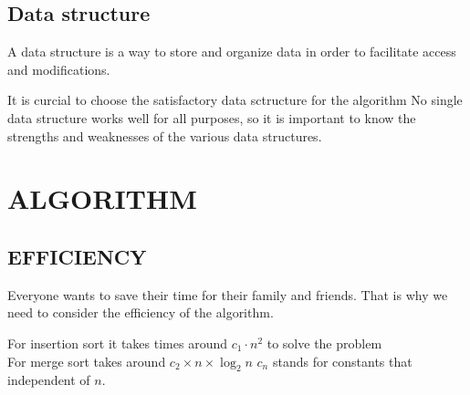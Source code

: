 \documentclass{article}
\theoremstyle{mytheoremstyle}
\theoremstyle{mytheoremstyle}
\theoremstyle{myproblemstyle}
\theoremstyle{myproblemstyle}
\begin{document}
\subsection{Data structure}
\begin{definition}
  A data structure is a way to store and organize data in order to facilitate access and modifications.
\end{definition}
It is curcial to choose the satisfactory data sctructure for the algorithm
No single data structure works well for all purposes, so it is important to know the strengths and weaknesses of the various data structures.


\section{ALGORITHM}
\subsection{EFFICIENCY}
Everyone wants to save their time for their family and friends.
That is why we need to consider the efficiency of the algorithm.
\begin{example}
 For insertion sort it takes times around $c_1\cdot n^2$ to solve the problem \\
 For merge sort takes around $c_2\times n \times \log_{2}n$
$c_n$ stands for constants that independent of $n$.
\end{example}
\end{document}
